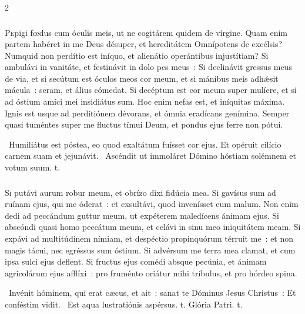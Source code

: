 \documentclass[9pt,twoside]{extarticle}
\begin{document}
\begin{multicols}{2}
{\subsubsection*{\center{}}
\lettrine{P}epigi fœdus cum óculis meis, ut ne cogitárem quidem de vírgine. Quam enim partem habéret in me Deus désuper, et hereditátem Omnípotens de excélsis? Numquid non perdítio est iníquo, et alienátio operántibus injustítiam? Si ambulávi in vanitáte, et festinávit in dolo pes meus~: Si declinávit gressus meus de via, et si secútum est óculos meos cor meum, et si mánibus meis adhǽsit mácula~: seram, et álius cómedat. Si decéptum est cor meum super mulíere, et si ad óstium amíci mei insidiátus sum. Hoc enim nefas est, et iníquitas máxima. Ignis est usque ad perditiónem dévorans, et ómnia eradícans genímina. Semper quasi tuméntes super me fluctus tímui Deum, et pondus ejus ferre non pótui. 

\begin{tightlist}{}
\item {}~Humiliátus est póstea, eo quod exaltátum fuísset cor ejus. \textred{*} Et opéruit cilício carnem suam et jejunávit. ~Ascéndit ut immoláret Dómino hóstiam solémnem et votum suum. t.
\end{tightlist}

\subsubsection*{\center {}}
\lettrine{S}i putávi aurum robur meum, et obrízo dixi fidúcia mea. Si gavísus sum ad ruínam ejus, qui me óderat~: et exsultávi, quod invenísset eum malum. Non enim dedi ad peccándum guttur meum, ut expéterem maledícens ánimam ejus. Si abscóndi quasi homo peccátum meum, et celávi in sinu meo iniquitátem meam. Si expávi ad multitúdinem nímiam, et despéctio propinquórum térruit me~: et non magis tácui, nec egréssus sum óstium. Si advérsum me terra mea clamat, et cum ipsa sulci ejus deflent. Si fructus ejus comédi absque pecúnia, et ánimam agricolárum ejus afflíxi~: pro fruménto oriátur mihi tríbulus, et pro hórdeo spina. 

\begin{tightlist}{}
\item {}~Invénit hóminem, qui erat cæcus, et ait~: sanat te Dóminus Jesus Christus~: \textred{*} Et conféstim vidit. ~Est aqua lustratiónis aspérsus. t. Glória Patri. t.
\end{tightlist}

}
\end{multicols}
\end{document}
